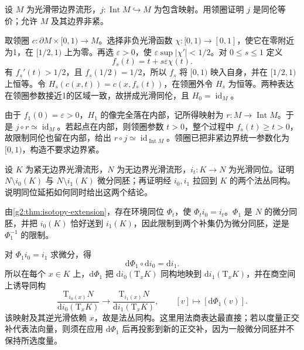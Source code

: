 \begin{exercise}\label{g2:ex:interior-homotopy-equivalence}
	设 \(M\) 为光滑带边界流形，\(j:\operatorname{Int}M\hookrightarrow M\) 为包含映射。用领圈证明 \(j\) 是同伦等价；允许 \(M\) 及其边界非紧。
\end{exercise}
\begin{solution}
	取领圈 \(c:\partial M\times[0,1)\to M\)。选择非负光滑函数 \(\chi:[0,1)\to[0,1]\)，使它在零附近为1，在 \([1/2,1)\) 上为零。再选 \(\varepsilon>0\)，使 \(\varepsilon\sup|\chi'|<1/2\)。对 \(0\le s\le1\) 定义
	\[
		f_s(t)=t+s\varepsilon\chi(t).
	\]
	有 \(f_s'(t)>1/2\)，且 \(f_s(1/2)=1/2\)，所以 \(f_s\) 将 \([0,1)\) 映入自身，并在 \([1/2,1)\) 上恒等。令 \(H_s(c(x,t))=c(x,f_s(t))\)，在领圈外令 \(H_s\) 为恒等。两种表达在领圈参数接近1的区域一致，故拼成光滑同伦，且 \(H_0=\operatorname{id}_M\)。

	由于 \(f_1(0)=\varepsilon>0\)，\(H_1\) 的像完全落在内部，记所得映射为 \(r:M\to\operatorname{Int}M\)。于是 \(j\circ r\simeq\operatorname{id}_M\)。若起点在内部，则领圈参数 \(t>0\)，整个过程中 \(f_s(t)\ge t>0\)，故限制同伦也留在内部，给出 \(r\circ j\simeq\operatorname{id}_{\operatorname{Int}M}\)。领圈已把非紧边界统一参数化为 \([0,1)\)，构造不要求边界紧。
\end{solution}

\begin{exercise}\label{g2:ex:isotopy-complement-normal}
	设 \(K\) 为紧无边界光滑流形，\(N\) 为无边界光滑流形，\(i_t:K\to N\) 为光滑同位。证明 \(N\setminus i_0(K)\) 与 \(N\setminus i_1(K)\) 微分同胚；再证明经 \(i_0,i_1\) 拉回到 \(K\) 的两个法丛同构。说明同位延拓如何同时给出这两个结论。
\end{exercise}
\begin{solution}
	由\cref{g2:thm:isotopy-extension}，存在环境同位 \(\Phi_t\)，使 \(\Phi_t i_0=i_t\)。\(\Phi_1\) 是 \(N\) 的微分同胚，并把 \(i_0(K)\) 恰好送到 \(i_1(K)\)，因此限制到两个补集仍为微分同胚，逆是 \(\Phi_1^{-1}\) 的限制。

	对 \(\Phi_1 i_0=i_1\) 求微分，得
	\[
		\mathrm{d}\Phi_1\circ\mathrm{d}i_0=\mathrm{d}i_1.
	\]
	所以在每个 \(x\in K\) 上，\(\mathrm{d}\Phi_1\) 把 \(\mathrm{d}i_0(\mathrm{T}_xK)\) 同构地映到 \(\mathrm{d}i_1(\mathrm{T}_xK)\)，并在商空间上诱导同构
	\[
		\frac{\mathrm{T}_{i_0(x)}N}{\mathrm{d}i_0(\mathrm{T}_xK)}\longrightarrow
		\frac{\mathrm{T}_{i_1(x)}N}{\mathrm{d}i_1(\mathrm{T}_xK)},\qquad
		[v]\longmapsto[\mathrm{d}\Phi_1(v)].
	\]
	该映射及其逆光滑依赖 \(x\)，故是法丛同构。这里用法商表达最直接；若以度量正交补代表法向量，则须在应用 \(\mathrm{d}\Phi_1\) 后再投影到新的正交补，因为一般微分同胚并不保持所选度量。
\end{solution}

